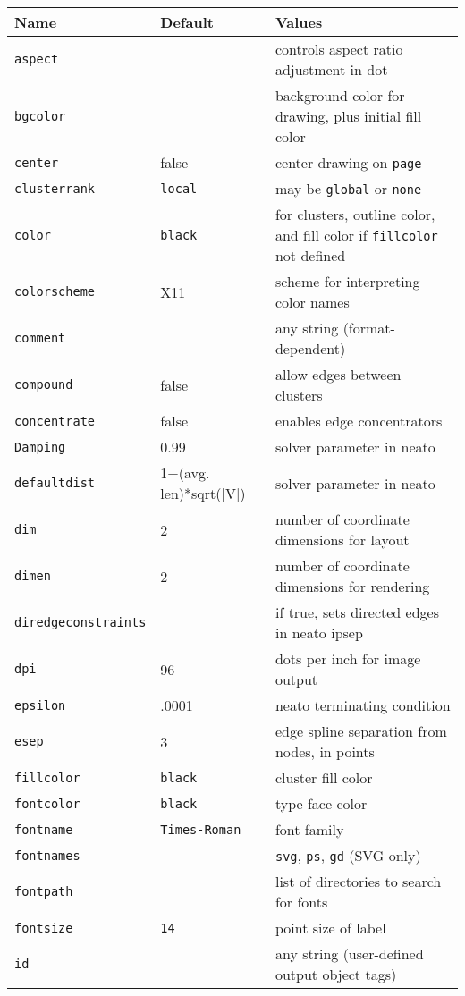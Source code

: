 \documentclass[11pt]{article}
\begin{document}
\begin{table}[p]\footnotesize
\begin{tabular}[t]{|l|l|p{3.5in}|} \hline
Name & Default & Values \\ \hline
{\tt aspect} &  & controls aspect ratio adjustment in dot \\
{\tt bgcolor} &  & background color for drawing, plus initial fill color \\
{\tt center} & false & center drawing on {\tt page} \\ 
{\tt clusterrank} & {\tt local} & may be {\tt global} or {\tt none} \\
{\tt color} & {\tt black} & for clusters, outline color, and fill color
if {\tt fillcolor} not defined \\
{\tt colorscheme} & X11 & scheme for interpreting color names \\
{\tt comment} & & any string (format-dependent) \\
{\tt compound} & false & allow edges between clusters \\
{\tt concentrate} & false & enables edge concentrators  \\ 
{\tt Damping} & 0.99 & solver parameter in neato \\ 
{\tt defaultdist} & 1+(avg. len)*sqrt(|V|) & solver parameter in neato \\ 
{\tt dim} & 2 & number of coordinate dimensions for layout \\
{\tt dimen} & 2 & number of coordinate dimensions for rendering \\
{\tt diredgeconstraints} & & if true, sets directed edges in neato ipsep \\
{\tt dpi} & 96 & dots per inch for image output \\
{\tt epsilon} & .0001 & neato terminating condition \\
{\tt esep} & 3 & edge spline separation from nodes, in points \\
{\tt fillcolor} & {\tt black} & cluster fill color \\
{\tt fontcolor} & {\tt black} & type face color \\ 
{\tt fontname} & {\tt Times-Roman} & font family \\
{\tt fontnames} & & {\tt svg}, {\tt ps}, {\tt gd} (SVG only) \\
{\tt fontpath} &  & list of directories to search for fonts \\
{\tt fontsize} & {\tt 14} & point size of label \\
{\tt id} & & any string (user-defined output object tags) \\

\end{tabular}
\end{table}
\end{document}
